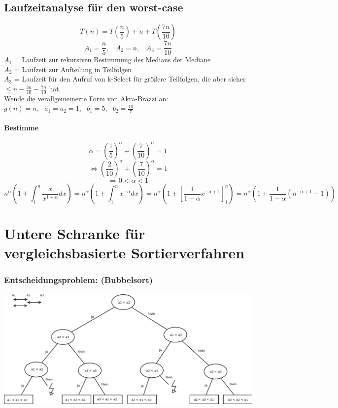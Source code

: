 \subsection{Laufzeitanalyse für den worst-case}
\[T(n) = T\left(\frac{n}{5}\right)+n+T \left(\frac{7n}{10} \right) \]
\[A_1 = \frac{n}{5},~~~~A_2 = n,~~~~A_3= \frac{7n}{10}\]
$A_1$ = Laufzeit zur rekursiven Bestimmung des Medians der Mediane\\
$A_2$ = Laufzeit zur Aufteilung in Teilfolgen\\
$A_3$ = Laufzeit für den Aufruf von k-Select  für größere Teilfolgen, die aber sicher $\leq n - \frac{3n}{10} - \frac{7n}{10}$ hat.\\

Wende die verallgemeinerte Form von Akra-Brazzi an:\\
$g(n)=n, ~~~a_1=a_2=1, ~~~b_1=5, ~~~b_2=\frac{10}{7}$\\
\paragraph{Bestimme}
\[\alpha = \left(\frac{1}{5}\right)^{\alpha} + \left(\frac{7}{10}\right)^{\alpha} = 1\]
\[\Leftrightarrow \left(\frac{2}{10}\right)^{\alpha} + \left(\frac{7}{10}\right)^{\alpha} = 1\]
\[\Rightarrow 0 < \alpha < 1 \]
\[n^{\alpha}\left(1+\int_1^n \frac{x}{x^{1+\alpha}} dx\right) = n^{\alpha}\left(1+\int_1^n x^{-\alpha} dx\right) = n^{\alpha}\left(1+ \left[\frac{1}{1-\alpha} x^{-\alpha+1} \right]_1^n\right) = n^{\alpha}\left(1+\frac{1}{1-\alpha} \left(n^{-\alpha+1}-1\right)\right)\]

\newpage

\section{Untere Schranke für vergleichsbasierte Sortierverfahren}
\subsubsection*{Entscheidungsproblem: (Bubbelsort)}
\includegraphics[width=\linewidth]{8/Grafik/img2.png}\\

